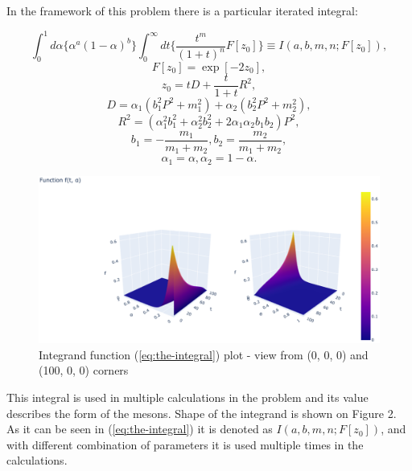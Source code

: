 \documentclass[%
]{ittmm}
\begin{document}
In the framework of this problem there is a particular iterated integral:

\begin{equation}
    \label{eq:the-integral}
    \int_{0}^{1}d\alpha\{\alpha^{a}(1 - \alpha)^b\}\int_{0}^{\infty}dt\{\frac{t^m}{(1+t)^n}F[z_{0}]\} \equiv I(a, b, m, n; F[z_{0}]),
\end{equation}
\begin{equation}   
    F[z_0] = \exp[-2z_0],
\end{equation}
\begin{equation} 
    z_0 = tD + \frac{t}{1 + t}R^2,
\end{equation}
\begin{equation}     
    D = \alpha_1(b_1^{2}P^2 + m_1^2) + \alpha_2(b_2^{2}P^2 + m_2^2),
\end{equation}
\begin{equation} 
        R^2 = (\alpha_1^{2}b_1^2 + \alpha_2^{2}b_2^2 + 2\alpha_{1}\alpha_{2}b_{1}b_2)P^2,
\end{equation}
\begin{equation} 
    b_1 = -\frac{m_1}{m_1 + m_2},
    b_2 = \frac{m_2}{m_1 + m_2},
\end{equation}
\begin{equation}
    \alpha_1 = \alpha, \alpha_2 = 1 - \alpha.
\end{equation}

\begin{figure}
    \centering
    \includegraphics[width=0.8\linewidth]{f(t,a)33.png}
    \caption{Integrand function (\ref{eq:the-integral}) plot - view from (0, 0, 0) and (100, 0, 0) corners}
    \label{fig:integrand-plot}
\end{figure}

\noindent This integral is used in multiple calculations in the problem and its value describes the form of the mesons. Shape of the integrand is shown on Figure 2. As it can be seen in (\ref{eq:the-integral}) it is denoted as $I(a, b, m, n; F[z_{0}])$, and with different combination of parameters it is used multiple times in the calculations.
\end{document}
